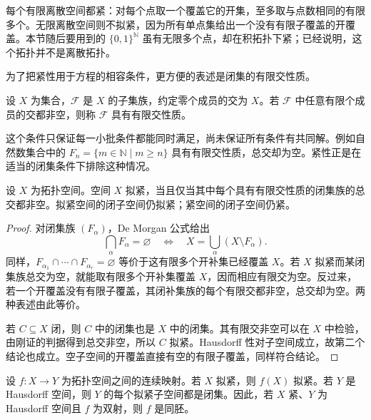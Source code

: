 \ProseParagraphBreak
每个有限离散空间都紧：对每个点取一个覆盖它的开集，至多取与点数相同的有限多个。无限离散空间则不拟紧，因为所有单点集给出一个没有有限子覆盖的开覆盖。本节随后要用到的 \(\{0,1\}^{\mathbb N}\) 虽有无限多个点，却在积拓扑下紧；已经说明，这个拓扑并不是离散拓扑。

\ProseParagraphBreak
为了把紧性用于方程的相容条件，更方便的表述是闭集的有限交性质。

\begin{samepage}
	\begin{definition}\label{b1:def:finite-intersection-property-appendix}
		设 \(X\) 为集合，\(\mathcal F\) 是 \(X\) 的子集族，约定零个成员的交为 \(X\)。若 \(\mathcal F\) 中任意有限个成员的交都非空，则称 \(\mathcal F\) 具有有限交性质。
	\end{definition}
\end{samepage}

这个条件只保证每一小批条件都能同时满足，尚未保证所有条件有共同解。例如自然数集合中的 \(F_n=\{m\in\mathbb N\mid m\geq n\}\) 具有有限交性质，总交却为空。紧性正是在适当的闭集条件下排除这种情况。

\begin{proposition}\label{b1:prop:compact-fip}
	设 \(X\) 为拓扑空间。空间 \(X\) 拟紧，当且仅当其中每个具有有限交性质的闭集族的总交都非空。拟紧空间的闭子空间仍拟紧；紧空间的闭子空间仍紧。
\end{proposition}

\begin{proof}
	对闭集族 \((F_\alpha)\)，De Morgan 公式给出
	\[
		\bigcap_\alpha F_\alpha=\varnothing \quad\Longleftrightarrow\quad X=\bigcup_\alpha(X\setminus F_\alpha).
	\]
	同样，\(F_{\alpha_1}\cap\cdots\cap F_{\alpha_r}=\varnothing\) 等价于这有限多个开补集已经覆盖 \(X\)。若 \(X\) 拟紧而某闭集族总交为空，就能取有限多个开补集覆盖 \(X\)，因而相应有限交为空。反过来，若一个开覆盖没有有限子覆盖，其闭补集族的每个有限交都非空，总交却为空。两种表述由此等价。

	若 \(C\subseteq X\) 闭，则 \(C\) 中的闭集也是 \(X\) 中的闭集。其有限交非空可以在 \(X\) 中检验，由刚证的判据得到总交非空，所以 \(C\) 拟紧。Hausdorff 性对子空间成立，故第二个结论也成立。空子空间的开覆盖直接有空的有限子覆盖，同样符合结论。
\end{proof}

\begin{proposition}\label{b1:prop:compact-maps}
	设 \(f:X\rightarrow Y\) 为拓扑空间之间的连续映射。若 \(X\) 拟紧，则 \(f(X)\) 拟紧。若 \(Y\) 是 Hausdorff 空间，则 \(Y\) 的每个拟紧子空间都是闭集。因此，若 \(X\) 紧、\(Y\) 为 Hausdorff 空间且 \(f\) 为双射，则 \(f\) 是同胚。
\end{proposition}

